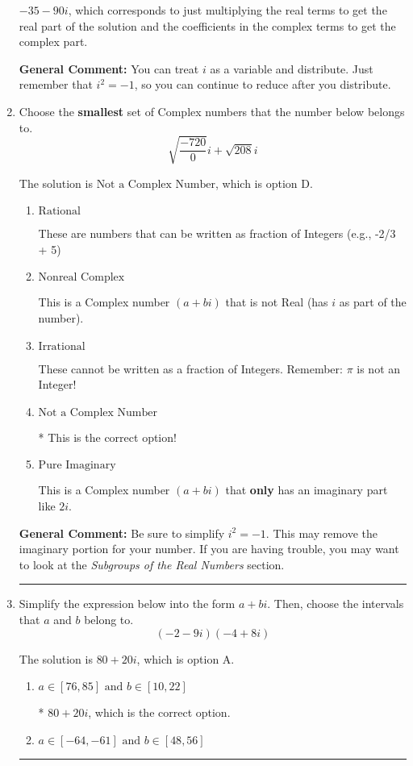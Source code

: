 \documentclass{extbook}[14pt]
\newcommand{\litem}[1]{\item #1

\rule{\textwidth}{0.4pt}}
\begin{document}
\begin{enumerate}
{\begin{enumerate}[label=\Alph*.]
 $-35 - 90 i$, which corresponds to just multiplying the real terms to get the real part of the solution and the coefficients in the complex terms to get the complex part.
\end{enumerate}

\textbf{General Comment:} You can treat $i$ as a variable and distribute. Just remember that $i^2=-1$, so you can continue to reduce after you distribute.
}
\litem{
Choose the \textbf{smallest} set of Complex numbers that the number below belongs to.
\[ \sqrt{\frac{-720}{0}} i+\sqrt{208}i \]

The solution is \( \text{Not a Complex Number} \), which is option D.\begin{enumerate}[label=\Alph*.]
\item \( \text{Rational} \)

These are numbers that can be written as fraction of Integers (e.g., -2/3 + 5)
\item \( \text{Nonreal Complex} \)

This is a Complex number $(a+bi)$ that is not Real (has $i$ as part of the number).
\item \( \text{Irrational} \)

These cannot be written as a fraction of Integers. Remember: $\pi$ is not an Integer!
\item \( \text{Not a Complex Number} \)

* This is the correct option!
\item \( \text{Pure Imaginary} \)

This is a Complex number $(a+bi)$ that \textbf{only} has an imaginary part like $2i$.
\end{enumerate}

\textbf{General Comment:} Be sure to simplify $i^2 = -1$. This may remove the imaginary portion for your number. If you are having trouble, you may want to look at the \textit{Subgroups of the Real Numbers} section.
}
\litem{
Simplify the expression below into the form $a+bi$. Then, choose the intervals that $a$ and $b$ belong to.
\[ (-2 - 9 i)(-4 + 8 i) \]

The solution is \( 80 + 20 i \), which is option A.\begin{enumerate}[label=\Alph*.]
\item \( a \in [76, 85] \text{ and } b \in [10, 22] \)

* $80 + 20 i$, which is the correct option.
\item \( a \in [-64, -61] \text{ and } b \in [48, 56] \)


\end{enumerate}}
\end{enumerate}
\end{document}
